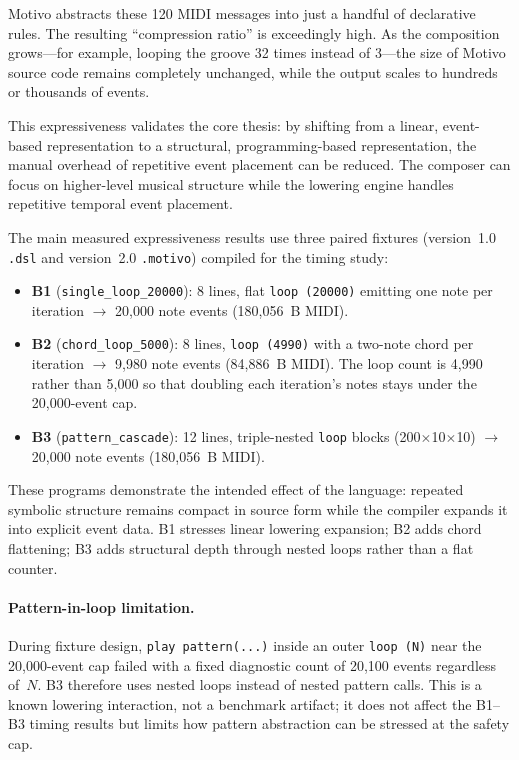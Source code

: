 Motivo abstracts these 120 MIDI messages into just a handful of declarative rules.
The resulting ``compression ratio'' is exceedingly high.
As the composition grows---for example, looping the groove 32 times instead of 3---the size of Motivo source code
remains completely unchanged, while the output scales to hundreds or thousands of events.

This expressiveness validates the core thesis: by shifting from a linear, event-based representation to a structural,
programming-based representation, the manual overhead of repetitive event placement can be reduced.
The composer can focus on higher-level musical structure while the lowering engine handles repetitive temporal event
placement.

The main measured expressiveness results use three paired fixtures (version~1.0 \texttt{.dsl} and version~2.0
\texttt{.motivo}) compiled for the timing study:

\begin{itemize}
  \item \textbf{B1} (\texttt{single\_loop\_20000}): 8 lines, flat \texttt{loop (20000)} emitting one note per
    iteration $\rightarrow$ 20,000 note events (180,056~B MIDI).
  \item \textbf{B2} (\texttt{chord\_loop\_5000}): 8 lines, \texttt{loop (4990)} with a two-note chord per iteration
    $\rightarrow$ 9,980 note events (84,886~B MIDI).
    The loop count is 4,990 rather than 5,000 so that doubling each iteration's notes stays under the 20,000-event cap.
  \item \textbf{B3} (\texttt{pattern\_cascade}): 12 lines, triple-nested \texttt{loop} blocks (200$\times$10$\times$10)
    $\rightarrow$ 20,000 note events (180,056~B MIDI).
\end{itemize}

These programs demonstrate the intended effect of the language: repeated symbolic structure remains compact in source
form while the compiler expands it into explicit event data.
B1 stresses linear lowering expansion; B2 adds chord flattening; B3 adds structural depth through nested
loops rather than
a flat counter.

\paragraph{Pattern-in-loop limitation.}
During fixture design, \texttt{play pattern(...)} inside an outer \texttt{loop (N)} near the 20,000-event cap failed
with a fixed diagnostic count of 20,100 events regardless of~$N$.
B3 therefore uses nested loops instead of nested pattern calls.
This is a known lowering interaction, not a benchmark artifact; it does not affect the B1--B3 timing results but limits
how pattern abstraction can be stressed at the safety cap.

